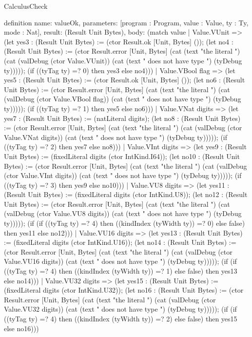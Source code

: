\begin{lexlean}{CalculusCheck}
\begin{semanticmodule}
definition{
  name: valueOk,
  parameters: [program : Program, value : Value, ty : Ty, mode : Nat],
  result: (Result Unit Bytes),
  body: (match value
    | Value.VUnit => (let yes3 : (Result Unit Bytes) := (ctor Result.ok [Unit, Bytes] ()); (let no4 : (Result Unit Bytes) := (ctor Result.error [Unit, Bytes] (cat (text "the literal ") (cat (valDebug (ctor Value.VUnit)) (cat (text " does not have type ") (tyDebug ty))))); (if ((tyTag ty) =? 0) then yes3 else no4)))
    | Value.VBool flag => (let yes5 : (Result Unit Bytes) := (ctor Result.ok [Unit, Bytes] ()); (let no6 : (Result Unit Bytes) := (ctor Result.error [Unit, Bytes] (cat (text "the literal ") (cat (valDebug (ctor Value.VBool flag)) (cat (text " does not have type ") (tyDebug ty))))); (if ((tyTag ty) =? 1) then yes5 else no6)))
    | Value.VNat digits => (let yes7 : (Result Unit Bytes) := (natLiteral digits); (let no8 : (Result Unit Bytes) := (ctor Result.error [Unit, Bytes] (cat (text "the literal ") (cat (valDebug (ctor Value.VNat digits)) (cat (text " does not have type ") (tyDebug ty))))); (if ((tyTag ty) =? 2) then yes7 else no8)))
    | Value.VInt digits => (let yes9 : (Result Unit Bytes) := (fixedLiteral digits (ctor IntKind.I64)); (let no10 : (Result Unit Bytes) := (ctor Result.error [Unit, Bytes] (cat (text "the literal ") (cat (valDebug (ctor Value.VInt digits)) (cat (text " does not have type ") (tyDebug ty))))); (if ((tyTag ty) =? 3) then yes9 else no10)))
    | Value.VU8 digits => (let yes11 : (Result Unit Bytes) := (fixedLiteral digits (ctor IntKind.U8)); (let no12 : (Result Unit Bytes) := (ctor Result.error [Unit, Bytes] (cat (text "the literal ") (cat (valDebug (ctor Value.VU8 digits)) (cat (text " does not have type ") (tyDebug ty))))); (if (if ((tyTag ty) =? 4) then ((kindIndex (tyWidth ty)) =? 0) else false) then yes11 else no12)))
    | Value.VU16 digits => (let yes13 : (Result Unit Bytes) := (fixedLiteral digits (ctor IntKind.U16)); (let no14 : (Result Unit Bytes) := (ctor Result.error [Unit, Bytes] (cat (text "the literal ") (cat (valDebug (ctor Value.VU16 digits)) (cat (text " does not have type ") (tyDebug ty))))); (if (if ((tyTag ty) =? 4) then ((kindIndex (tyWidth ty)) =? 1) else false) then yes13 else no14)))
    | Value.VU32 digits => (let yes15 : (Result Unit Bytes) := (fixedLiteral digits (ctor IntKind.U32)); (let no16 : (Result Unit Bytes) := (ctor Result.error [Unit, Bytes] (cat (text "the literal ") (cat (valDebug (ctor Value.VU32 digits)) (cat (text " does not have type ") (tyDebug ty))))); (if (if ((tyTag ty) =? 4) then ((kindIndex (tyWidth ty)) =? 2) else false) then yes15 else no16)))
}
\end{semanticmodule}
\end{lexlean}
